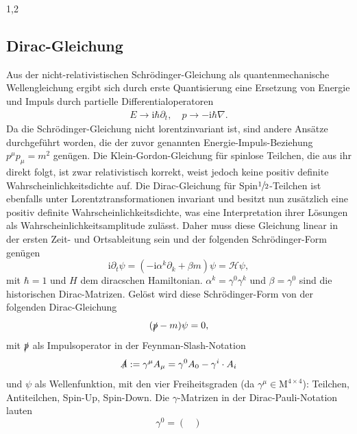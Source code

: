 \documentclass[11pt,a4paper,twoside]{report}
\begin{document}
\begin{spacing}{1,2}
\subsection{Dirac-Gleichung}
Aus der nicht-relativistischen Schrödinger-Gleichung als quantenmechanische Wellengleichung ergibt sich durch erste Quantisierung \cite{TeilFortgeschr} eine Ersetzung von Energie 
und Impuls durch partielle Differentialoperatoren
\begin{align*}
 E \rightarrow \text{i}\hbar\partial_t, \quad p \rightarrow -\text{i}\hbar\nabla.
\end{align*}
Da die Schrödinger-Gleichung nicht lorentzinvariant ist, sind andere Ansätze durchgeführt worden, die der zuvor genannten Energie-Impuls-Beziehung $p^\mu p_\mu = m^2$
genügen. Die Klein-Gordon-Gleichung für spinlose Teilchen, die aus ihr direkt folgt, ist zwar relativistisch korrekt, weist jedoch keine positiv definite 
Wahrscheinlichkeitsdichte auf. Die Dirac-Gleichung für Spin$\sfrac{1}{2}$-Teilchen ist ebenfalls unter Lorentztransformationen invariant und besitzt nun
zusätzlich eine positiv definite Wahrscheinlichkeitsdichte, was eine Interpretation ihrer Lösungen als Wahrscheinlichkeitsamplitude zulässt. Daher muss diese
Gleichung linear in der ersten Zeit- und Ortsableitung sein und der folgenden Schrödinger-Form genügen \cite{RelQuantMech}
\begin{equation}
 \text{i} \partial_t \psi = \left(-\text{i}\alpha^k\partial_k + \beta m\right)\psi = \mathcal{H} \psi,
 \label{eq_diracSchroedinger}
\end{equation}
mit $\hbar = 1$ und $H$ dem diracschen Hamiltonian. $\alpha^k = \gamma^0\gamma^k$ und $\beta = \gamma^0$ sind die historischen Dirac-Matrizen. Gelöst wird
diese Schrödinger-Form von der folgenden Dirac-Gleichung
\begin{equation}
 (\slashed{p} - m )\psi = 0,
 \label{eq_dirac}
\end{equation}
mit $\slashed{p}$ als Impulsoperator in der Feynman-Slash-Notation
\begin{equation}
 \slashed{A} := \gamma^\mu A_\mu = \gamma^0 A_0 - \gamma^i\cdot A_i
\end{equation}
und $\psi$ als Wellenfunktion, mit den vier Freiheitsgraden (da $\gamma^\mu \in \text{M}^{4\times4}$): Teilchen, Antiteilchen, Spin-Up, Spin-Down.
Die $\gamma$-Matrizen in der Dirac-Pauli-Notation lauten
\begin{equation*}
  \gamma^0 = \begin{pmatrix} 

\end{pmatrix}
\end{equation*}
\end{spacing}
\end{document}
